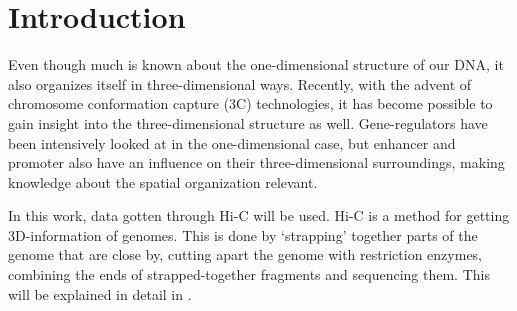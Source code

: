 \chapter{Introduction}\label{chap:introduction}


%
%
%
%
%
%

Even though much is known about the one-dimensional structure of our DNA, it
also organizes itself in three-dimensional ways. Recently, with the advent of
chromosome conformation capture (3C) technologies, it has become possible to gain
insight into the three-dimensional structure as well. Gene-regulators have been
intensively looked at in the one-dimensional case, but enhancer and promoter
also have an influence on their three-dimensional surroundings, making knowledge
about the spatial organization relevant.

In this work, data gotten through Hi-C \cite{lieberman2009comprehensive} will
be used. Hi-C is a method for getting 3D-information of genomes.  This is done
by `strapping' together parts of the genome that are close by, cutting apart
the genome with restriction enzymes, combining the ends of strapped-together
fragments and sequencing them. This will be explained in detail in
.


